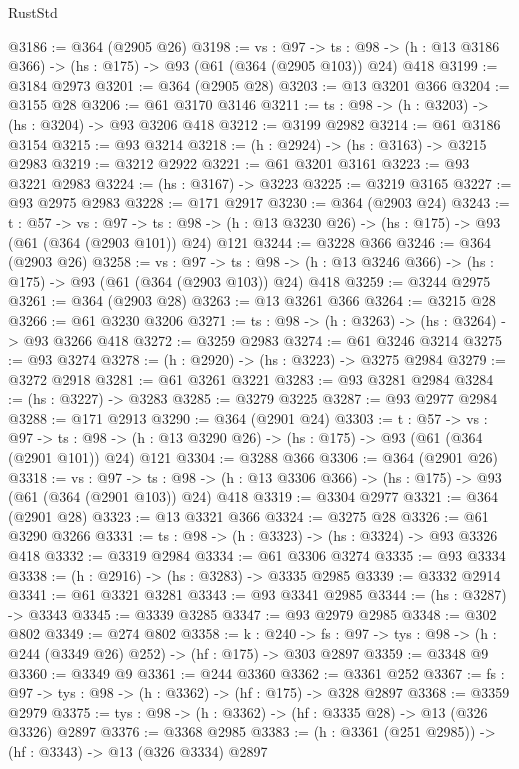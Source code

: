 \begin{lexlean}{RustStd}
\begin{coremodule}
{\begin{coremodule}
{{{{{{{{{@3186 := @364 (@2905 @26)
@3198 := {vs : @97} ->
  {ts : @98} -> (h : @13 @3186 @366) -> (hs : @175) -> @93 (@61 (@364 (@2905 @103)) @24) @418
@3199 := @3184 @2973
@3201 := @364 (@2905 @28)
@3203 := @13 @3201 @366
@3204 := @3155 @28
@3206 := @61 @3170 @3146
@3211 := {ts : @98} -> (h : @3203) -> (hs : @3204) -> @93 @3206 @418
@3212 := @3199 @2982
@3214 := @61 @3186 @3154
@3215 := @93 @3214
@3218 := (h : @2924) -> (hs : @3163) -> @3215 @2983
@3219 := @3212 @2922
@3221 := @61 @3201 @3161
@3223 := @93 @3221 @2983
@3224 := (hs : @3167) -> @3223
@3225 := @3219 @3165
@3227 := @93 @2975 @2983
@3228 := @171 @2917
@3230 := @364 (@2903 @24)
@3243 := {t : @57} ->
  {vs : @97} ->
  {ts : @98} -> (h : @13 @3230 @26) -> (hs : @175) -> @93 (@61 (@364 (@2903 @101)) @24) @121
@3244 := @3228 @366
@3246 := @364 (@2903 @26)
@3258 := {vs : @97} ->
  {ts : @98} -> (h : @13 @3246 @366) -> (hs : @175) -> @93 (@61 (@364 (@2903 @103)) @24) @418
@3259 := @3244 @2975
@3261 := @364 (@2903 @28)
@3263 := @13 @3261 @366
@3264 := @3215 @28
@3266 := @61 @3230 @3206
@3271 := {ts : @98} -> (h : @3263) -> (hs : @3264) -> @93 @3266 @418
@3272 := @3259 @2983
@3274 := @61 @3246 @3214
@3275 := @93 @3274
@3278 := (h : @2920) -> (hs : @3223) -> @3275 @2984
@3279 := @3272 @2918
@3281 := @61 @3261 @3221
@3283 := @93 @3281 @2984
@3284 := (hs : @3227) -> @3283
@3285 := @3279 @3225
@3287 := @93 @2977 @2984
@3288 := @171 @2913
@3290 := @364 (@2901 @24)
@3303 := {t : @57} ->
  {vs : @97} ->
  {ts : @98} -> (h : @13 @3290 @26) -> (hs : @175) -> @93 (@61 (@364 (@2901 @101)) @24) @121
@3304 := @3288 @366
@3306 := @364 (@2901 @26)
@3318 := {vs : @97} ->
  {ts : @98} -> (h : @13 @3306 @366) -> (hs : @175) -> @93 (@61 (@364 (@2901 @103)) @24) @418
@3319 := @3304 @2977
@3321 := @364 (@2901 @28)
@3323 := @13 @3321 @366
@3324 := @3275 @28
@3326 := @61 @3290 @3266
@3331 := {ts : @98} -> (h : @3323) -> (hs : @3324) -> @93 @3326 @418
@3332 := @3319 @2984
@3334 := @61 @3306 @3274
@3335 := @93 @3334
@3338 := (h : @2916) -> (hs : @3283) -> @3335 @2985
@3339 := @3332 @2914
@3341 := @61 @3321 @3281
@3343 := @93 @3341 @2985
@3344 := (hs : @3287) -> @3343
@3345 := @3339 @3285
@3347 := @93 @2979 @2985
@3348 := @302 @802
@3349 := @274 @802
@3358 := {k : @240} ->
  {fs : @97} -> {tys : @98} -> (h : @244 (@3349 @26) @252) -> (hf : @175) -> @303 @2897
@3359 := @3348 @9
@3360 := @3349 @9
@3361 := @244 @3360
@3362 := @3361 @252
@3367 := {fs : @97} -> {tys : @98} -> (h : @3362) -> (hf : @175) -> @328 @2897
@3368 := @3359 @2979
@3375 := {tys : @98} -> (h : @3362) -> (hf : @3335 @28) -> @13 (@326 @3326) @2897
@3376 := @3368 @2985
@3383 := (h : @3361 (@251 @2985)) -> (hf : @3343) -> @13 (@326 @3334) @2897
}}}}}}}}}
\end{coremodule}}
\end{coremodule}
\end{lexlean}
